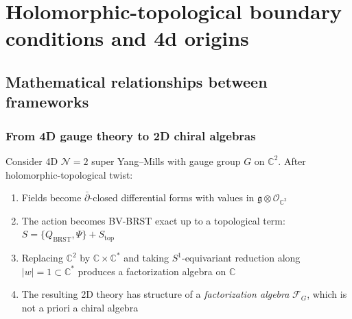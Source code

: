 \chapter{Holomorphic-topological boundary conditions and 4d origins}
\label{ch:ht-boundary}


\section{Mathematical relationships between frameworks}
\label{sec:precise-relationships-frameworks}

\subsection{From 4D gauge theory to 2D chiral algebras}

\begin{theorem}\label{thm:costello-li-reduction}
\cite{CL16} Consider 4D $\mathcal{N}=2$ super Yang--Mills with gauge group $G$ 
on $\mathbb{C}^2$. After holomorphic-topological twist:
\begin{enumerate}
\item Fields become $\bar{\partial}$-closed differential forms with values in 
      $\mathfrak{g} \otimes \mathcal{O}_{\mathbb{C}^2}$
      
\item The action becomes BV-BRST exact up to a topological term: $S = \{Q_{\text{BRST}}, \Psi\} + S_{\mathrm{top}}$

\item Replacing $\mathbb{C}^2$ by $\mathbb{C} \times \mathbb{C}^*$ and taking $S^1$-equivariant reduction along $|w| = 1 \subset \mathbb{C}^*$
      produces a factorization algebra on $\mathbb{C}$
      
\item The resulting 2D theory has structure of a \emph{factorization algebra}
      $\mathcal{F}_G$, which is not a priori a chiral algebra
\end{enumerate}
\end{theorem}

